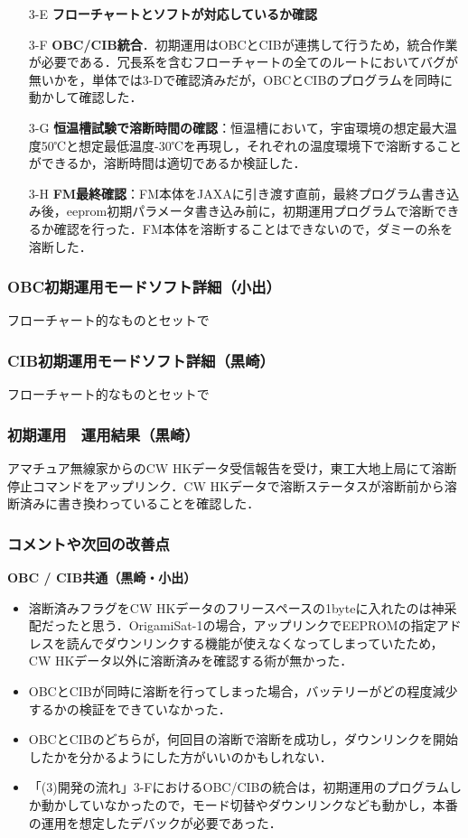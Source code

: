 \begin{itemize}
	\item[3-E] \textbf{フローチャートとソフトが対応しているか確認}
	\item[3-F] \textbf{OBC/CIB統合}．初期運用はOBCとCIBが連携して行うため，統合作業が必要である．冗長系を含むフローチャートの全てのルートにおいてバグが無いかを，単体では3-Dで確認済みだが，OBCとCIBのプログラムを同時に動かして確認した．
	\item[3-G] \textbf{恒温槽試験で溶断時間の確認}：恒温槽において，宇宙環境の想定最大温度50℃と想定最低温度-30℃を再現し，それぞれの温度環境下で溶断することができるか，溶断時間は適切であるか検証した．
	\item[3-H] \textbf{FM最終確認}：FM本体をJAXAに引き渡す直前，最終プログラム書き込み後，eeprom初期パラメータ書き込み前に，初期運用プログラムで溶断できるか確認を行った．FM本体を溶断することはできないので，ダミーの糸を溶断した．
	
\end{itemize}	

\subsubsection{OBC初期運用モードソフト詳細（小出）}
フローチャート的なものとセットで

\subsubsection{CIB初期運用モードソフト詳細（黒崎）}
フローチャート的なものとセットで

\subsubsection{初期運用　運用結果（黒崎）}
アマチュア無線家からのCW HKデータ受信報告を受け，東工大地上局にて溶断停止コマンドをアップリンク．CW HKデータで溶断ステータスが溶断前から溶断済みに書き換わっていることを確認した．

\subsubsection{コメントや次回の改善点}
\hspace{2ex}
\textbf{OBC / CIB共通（黒崎・小出）}
\begin{itemize}
	\item 溶断済みフラグをCW HKデータのフリースペースの1byteに入れたのは神采配だったと思う．OrigamiSat-1の場合，アップリンクでEEPROMの指定アドレスを読んでダウンリンクする機能が使えなくなってしまっていたため，CW HKデータ以外に溶断済みを確認する術が無かった．
	\item OBCとCIBが同時に溶断を行ってしまった場合，バッテリーがどの程度減少するかの検証をできていなかった．
	\item OBCとCIBのどちらが，何回目の溶断で溶断を成功し，ダウンリンクを開始したかを分かるようにした方がいいのかもしれない．
	\item 「(3)開発の流れ」3-FにおけるOBC/CIBの統合は，初期運用のプログラムしか動かしていなかったので，モード切替やダウンリンクなども動かし，本番の運用を想定したデバックが必要であった．
\end{itemize}

